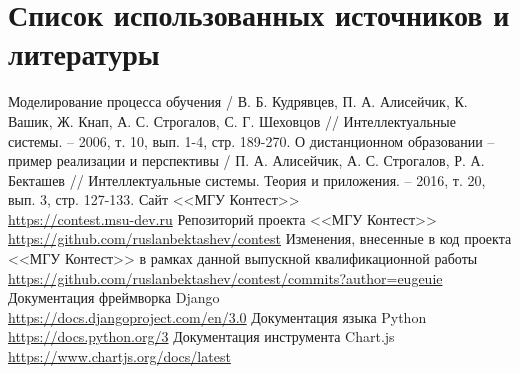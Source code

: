 \documentclass[12pt, a4paper, oneside]{article}
\begin{document}
\section{Список использованных источников и литературы}
\begingroup
\renewcommand{\section}[2]{}
\begin{thebibliography}{20}
    Моделирование процесса обучения / В. Б. Кудрявцев, П. А. Алисейчик, К. Вашик, Ж. Кнап, А. С. Строгалов, С. Г. Шеховцов // Интеллектуальные системы. – 2006, т. 10, вып. 1-4, стр. 189-270.
    О дистанционном образовании – пример реализации и перспективы / П. А. Алисейчик, А. С. Строгалов, Р. А. Бекташев // Интеллектуальные системы. Теория и приложения. – 2016, т. 20, вып. 3, стр. 127-133.
    Сайт <<МГУ Контест>>\\
    \url{https://contest.msu-dev.ru}
    Репозиторий проекта <<МГУ Контест>>\\
    \url{https://github.com/ruslanbektashev/contest}
    Изменения, внесенные в код проекта <<МГУ Контест>> в рамках данной выпускной квалификационной работы\\
    \url{https://github.com/ruslanbektashev/contest/commits?author=eugeuie}
    Документация фреймворка Django\\
    \url{https://docs.djangoproject.com/en/3.0}
    Документация языка Python\\
    \url{https://docs.python.org/3}
    Документация инструмента Chart.js\\
    \url{https://www.chartjs.org/docs/latest}
\end{thebibliography}
\endgroup
\end{document}
